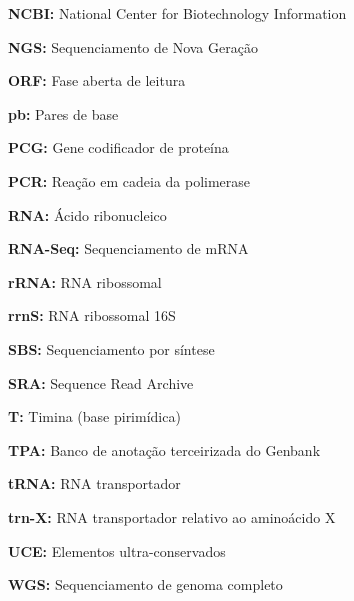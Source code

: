 \documentclass[
	12pt,				%
	oneside,
	a4paper,			%
	english,			%
	spanish,			%
	brazil				%
	]{abntex2}
\begin{document}
\begin{siglas}
  \item[\textbf{NCBI:}] National Center for Biotechnology Information 
  \item[\textbf{NGS:}] Sequenciamento de Nova Geração
  \item[\textbf{ORF:}] Fase aberta de leitura
  \item[\textbf{pb:}] Pares de base
  \item[\textbf{PCG:}] Gene codificador de proteína
  \item[\textbf{PCR:}] Reação em cadeia da polimerase
  \item[\textbf{RNA:}] Ácido ribonucleico
  \item[\textbf{RNA-Seq:}] Sequenciamento de mRNA
  \item[\textbf{rRNA:}] RNA ribossomal
  \item[\textbf{rrnS:}] RNA ribossomal 16S
  \item[\textbf{SBS:}] Sequenciamento por síntese
  \item[\textbf{SRA:}] Sequence Read Archive
  \item[\textbf{T:}] Timina (base pirimídica)
  \item[\textbf{TPA:}] Banco de anotação terceirizada do Genbank
  \item[\textbf{tRNA:}] RNA transportador
  \item[\textbf{trn-X:}] RNA transportador relativo ao aminoácido X
  \item[\textbf{UCE:}] Elementos ultra-conservados
  \item[\textbf{WGS:}] Sequenciamento de genoma completo
\end{siglas}



\tableofcontents*
\cleardoublepage



\textual
\end{document}
